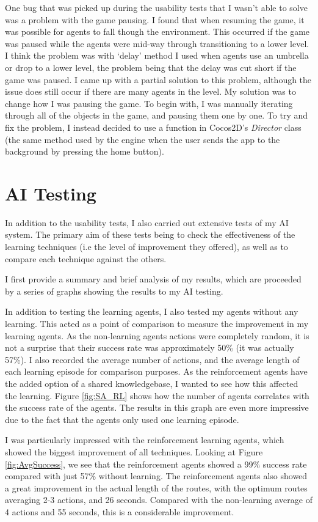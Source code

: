 \documentclass[a4paper,oneside]{report}
\begin{document}
One bug that was picked up during the usability tests that I wasn't able to solve was a problem with the game pausing. I found that when resuming the game, it was possible for agents to fall though the environment. This occurred if the game was paused while the agents were mid-way through transitioning to a lower level. I think the problem was with `delay' method I used when agents use an umbrella or drop to a lower level, the problem being that the delay was cut short if the game was paused. I came up with a partial solution to this problem, although the issue does still occur if there are many agents in the level. My solution was to change how I was pausing the game. To begin with, I was manually iterating through all of the objects in the game, and pausing them one by one. To try and fix the problem, I instead decided to use a function in Cocos2D's \emph{Director} class (the same method used by the engine when the user sends the app to the background by pressing the home button).

\section{AI Testing}

In addition to the usability tests, I also carried out extensive tests of my AI system. The primary aim of these tests being to check the effectiveness of the learning techniques (i.e the level of improvement they offered), as well as to compare each technique against the others.

I first provide a summary and brief analysis of my results, which are proceeded by a series of graphs showing the results to my AI testing.

In addition to testing the learning agents, I also tested my agents without any learning. This acted as a point of comparison to measure the improvement in my learning agents. As the non-learning agents actions were completely random, it is not a surprise that their success rate was approximately 50\% (it was actually 57\%). I also recorded the average number of actions, and the average length of each learning episode for comparison purposes. As the reinforcement agents have the added option of a shared knowledgebase, I wanted to see how this affected the learning. Figure \ref{fig:SA_RL} shows how the number of agents correlates with the success rate of the agents. The results in this graph are even more impressive due to the fact that the agents only used one learning episode.

I was particularly impressed with the reinforcement learning agents, which showed the biggest improvement of all techniques. Looking at Figure \ref{fig:AvgSuccess}, we see that the reinforcement agents showed a 99\% success rate compared with just 57\% without learning. The reinforcement agents also showed a great improvement in the actual length of the routes, with the optimum routes averaging 2-3 actions, and 26 seconds. Compared with the non-learning average of 4 actions and 55 seconds, this is a considerable improvement.
\end{document}
